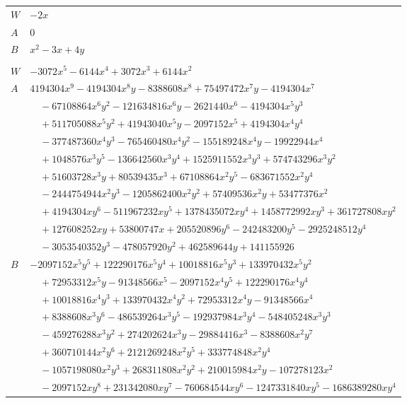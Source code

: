 \documentclass[11pt]{article}
\begin{document}
\begin{longtable}{@{}ll@{}}
$W$ & $-2x$\\
$A$ & $0$\\
$B$ & $x^{2}-3x+4y$\\
\addlinespace[3pt]
\multicolumn{2}{@{}l}{$i=20$, $m=2048$, neighbours $4,9,13,17,18,22,23$}\\
$W$ & $-3072x^{5}-6144x^{4}+3072x^{3}+6144x^{2}$\\
$A$ & $4194304x^{9}-4194304x^{8}y-8388608x^{8}+75497472x^{7}y-4194304x^{7}$\\
 & $\quad -67108864x^{6}y^{2}-121634816x^{6}y-2621440x^{6}-4194304x^{5}y^{3}$\\
 & $\quad +511705088x^{5}y^{2}+41943040x^{5}y-2097152x^{5}+4194304x^{4}y^{4}$\\
 & $\quad -377487360x^{4}y^{3}-765460480x^{4}y^{2}-155189248x^{4}y-19922944x^{4}$\\
 & $\quad +1048576x^{3}y^{5}-136642560x^{3}y^{4}+1525911552x^{3}y^{3}+574743296x^{3}y^{2}$\\
 & $\quad +51603728x^{3}y+80539435x^{3}+67108864x^{2}y^{5}-683671552x^{2}y^{4}$\\
 & $\quad -2444754944x^{2}y^{3}-1205862400x^{2}y^{2}+57409536x^{2}y+53477376x^{2}$\\
 & $\quad +4194304xy^{6}-511967232xy^{5}+1378435072xy^{4}+1458772992xy^{3}+361727808xy^{2}$\\
 & $\quad +127608252xy+53800747x+205520896y^{6}-242483200y^{5}-2925248512y^{4}$\\
 & $\quad -3053540352y^{3}-478057920y^{2}+462589644y+141155926$\\
$B$ & $-2097152x^{5}y^{5}+122290176x^{5}y^{4}+10018816x^{5}y^{3}+133970432x^{5}y^{2}$\\
 & $\quad +72953312x^{5}y-91348566x^{5}-2097152x^{4}y^{5}+122290176x^{4}y^{4}$\\
 & $\quad +10018816x^{4}y^{3}+133970432x^{4}y^{2}+72953312x^{4}y-91348566x^{4}$\\
 & $\quad +8388608x^{3}y^{6}-486539264x^{3}y^{5}-192937984x^{3}y^{4}-548405248x^{3}y^{3}$\\
 & $\quad -459276288x^{3}y^{2}+274202624x^{3}y-29884416x^{3}-8388608x^{2}y^{7}$\\
 & $\quad +360710144x^{2}y^{6}+2121269248x^{2}y^{5}+333774848x^{2}y^{4}$\\
 & $\quad -1057198080x^{2}y^{3}+268311808x^{2}y^{2}+210015984x^{2}y-107278123x^{2}$\\
 & $\quad -2097152xy^{8}+231342080xy^{7}-760684544xy^{6}-1247331840xy^{5}-1686389280xy^{4}$\\

\end{longtable}
\end{document}
